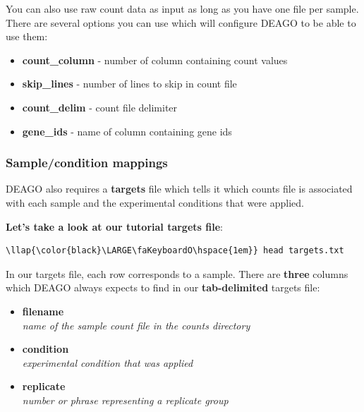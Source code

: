 \documentclass[11pt]{article}
\providecommand{\tightlist}{%
      \setlength{\itemsep}{0pt}\setlength{\parskip}{0pt}}
\begin{document}
You can also use raw count data as input as long as you have one file
per sample. There are several options you can use which will configure
DEAGO to be able to use them:

\begin{itemize}
\tightlist
\item
  \textbf{count\_column} - number of column containing count values
\item
  \textbf{skip\_lines} - number of lines to skip in count file
\item
  \textbf{count\_delim} - count file delimiter
\item
  \textbf{gene\_ids} - name of column containing gene ids
\end{itemize}

    \hypertarget{samplecondition-mappings}{%
\subsubsection{Sample/condition
mappings}\label{samplecondition-mappings}}

DEAGO also requires a \textbf{targets} file which tells it which counts
file is associated with each sample and the experimental conditions that
were applied.

\textbf{Let's take a look at our tutorial targets file}:

\begin{terminalinput}
\begin{Verbatim}[commandchars=\\\{\}]
\llap{\color{black}\LARGE\faKeyboardO\hspace{1em}} head targets.txt
\end{Verbatim}
\end{terminalinput}

    In our targets file, each row corresponds to a sample. There are
\textbf{three} columns which DEAGO always expects to find in our
\textbf{tab-delimited} targets file:

\begin{itemize}
\item
  \textbf{filename}\\
  \textit{name of the sample count file in the counts directory}
\item
  \textbf{condition}\\
  \textit{experimental condition that was applied}
\item
  \textbf{replicate}\\
  \textit{number or phrase representing a replicate group}
\end{itemize}
\end{document}
